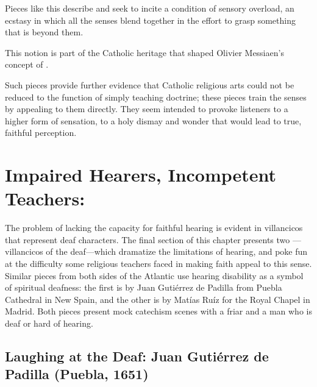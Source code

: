 Pieces like this describe and seek to incite a condition of sensory overload, 
an ecstasy in which all the senses blend together in the effort to grasp 
something that is beyond them.%
  \begin{Footnote}
      This notion is part of the Catholic heritage that shaped Olivier 
      Messiaen's concept of .
  \end{Footnote}
Such pieces provide further evidence that Catholic religious arts could not be 
reduced to the function of simply teaching doctrine; these pieces train the 
senses by appealing to them directly.
They seem intended to provoke listeners to a higher form of sensation, to a 
holy dismay and wonder that would lead to true, faithful perception.

\section{Impaired Hearers, Incompetent Teachers: }

The problem of lacking the capacity for faithful hearing is evident in
villancicos that represent deaf characters.
The final section of this chapter presents two ---villancicos of the deaf---which dramatize the limitations of hearing, 
and poke fun at the difficulty some religious teachers faced in making faith 
appeal to this sense.
Similar pieces from both sides of the Atlantic use hearing disability as a 
symbol of spiritual deafness: the first is by Juan Gutiérrez de Padilla from 
Puebla Cathedral in New Spain, and the other is by Matías Ruíz for the Royal 
Chapel in Madrid.
Both pieces present mock catechism scenes with a friar and a man who is deaf 
or hard of hearing.

\subsection{Laughing at the Deaf: Juan Gutiérrez de Padilla (Puebla, 1651)}

